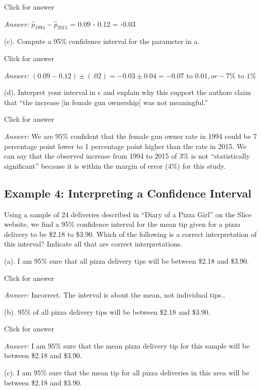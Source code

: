 \documentclass[
]{book}
\begin{document}
Click for answer

\emph{Answer:} \(\hat{p}_{1994} - \hat{p}_{2015}\) = 0.09 - 0.12 = -0.03

(c). Compute a 95\% confidence interval for the parameter in a.

Click for answer

\emph{Answer:} \((0.09 - 0.12) \pm (.02) = -0.03 \pm 0.04 = -0.07 \text{ to } 0.01, or -7\% \text{ to } 1\%\)

(d). Interpret your interval in c and explain why this support the authors claim that ``the increase {[}in female gun ownership{]} was not meaningful.''

Click for answer

\emph{Answer:} We are 95\% confident that the female gun owner rate in 1994 could be 7 percentage point lower to 1 percentage point higher than the rate in 2015. We can say that the observed increase from 1994 to 2015 of 3\% is not ``statistically significant'' because it is within the margin of error (4\%) for this study.

\hypertarget{example-4-interpreting-a-confidence-interval}{%
\subsection{Example 4: Interpreting a Confidence Interval}\label{example-4-interpreting-a-confidence-interval}}

Using a sample of 24 deliveries described in ``Diary of a Pizza Girl'' on the Slice website, we find a 95\% confidence interval for the mean tip given for a pizza delivery to be \$2.18 to \$3.90. Which of the following is a correct interpretation of this interval? Indicate all that are correct interpretations.

(a). I am 95\% sure that all pizza delivery tips will be between \$2.18 and \$3.90.

Click for answer

\emph{Answer:} Incorrect. The interval is about the mean, not individual tips..

(b). 95\% of all pizza delivery tips will be between \$2.18 and \$3.90.

Click for answer

\emph{Answer:} I am 95\% sure that the mean pizza delivery tip for this sample will be between \$2.18 and \$3.90.

(c). I am 95\% sure that the mean tip for all pizza deliveries in this area will be between \$2.18 and \$3.90.
\end{document}
